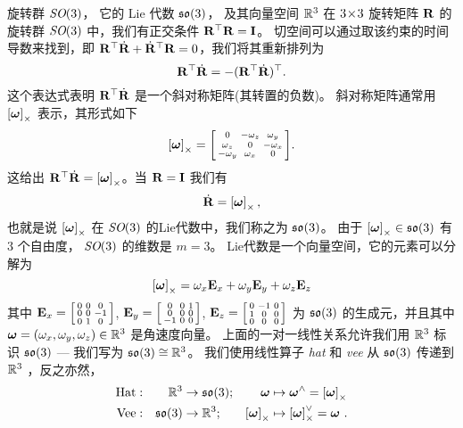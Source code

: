 
\begin{fexample}{旋转群 $\textit{SO}(3)$， 它的 Lie 代数 ${\mathfrak {so}}(3)$， 及其向量空间 ${\mathbb R}^3$}
\label{ex:SO3}
在 $3\!\times\!3$ 旋转矩阵 ${\bf R}$ 的旋转群 $\textit{SO}(3)$ 中，我们有正交条件 ${\bf R}^{\top}{\bf R}={\bf I}$。
切空间可以通过取该约束的时间导数来找到，即 ${\bf R}^{\top}\dot{{\bf R}}+\dot{{\bf R}}^{\top}{\bf R}=0$，我们将其重新排列为 $${\bf R}^{\top}\dot{{\bf R}}=-({\bf R}^{\top}\dot{{\bf R}})^{\top}.$$
这个表达式表明 ${\bf R}^{\top}\dot{{\bf R}}$ 是一个斜对称矩阵(其转置的负数)。
斜对称矩阵通常用 $\left[{{\bm \omega}}\right]_\times$ 表示，其形式如下 
%
$$\left[{{\bm \omega}}\right]_\times=\begin{bsmallmatrix}
0 & -\omega_z & \omega_y \\
\omega_z & 0 & -\omega_x \\
-\omega_y & \omega_x & 0 
\end{bsmallmatrix}
.$$
%
这给出 ${\bf R}^{\top}\dot{{\bf R}}=\left[{{\bm \omega}}\right]_\times$。当 ${\bf R}={\bf I}$ 我们有 $$\dot{{\bf R}}=\left[{{\bm \omega}}\right]_\times,$$ 也就是说 $\left[{{\bm \omega}}\right]_\times$ 在 $\textit{SO}(3)$ 的Lie代数中，我们称之为 ${\mathfrak {so}}(3)$。
%
由于 $\left[{{\bm \omega}}\right]_\times\in{\mathfrak {so}}(3)$ 有 $3$ 个自由度， $\textit{SO}(3)$ 的维数是 $m=3$。
Lie代数是一个向量空间，它的元素可以分解为
%
$$
\left[{{\bm \omega}}\right]_\times = 
  \omega_x{\bf E}_x+
  \omega_y{\bf E}_y+
  \omega_z{\bf E}_z
$$
其中  
$
{\bf E}_x=
\begin{bsmallmatrix}0&0&0\\0&0&-1\\0&1&0\end{bsmallmatrix}$, 
${\bf E}_y=
\begin{bsmallmatrix}0&0&1\\0&0&0\\-1&0&0\end{bsmallmatrix}$,
 ${\bf E}_z=
\begin{bsmallmatrix}0&-1&0\\1&0&0\\0&0&0\end{bsmallmatrix}$ 
为 ${\mathfrak {so}}(3)$ 的生成元，并且其中 ${{\bm \omega}}=(\omega_x,\omega_y,\omega_z)\in{\mathbb R}^3$ 是角速度向量。 
%
上面的一对一线性关系允许我们用 ${\mathbb R}^3$ 标识 ${\mathfrak {so}}(3)$ --- 我们写为 ${\mathfrak {so}}(3)\cong{\mathbb R}^3$。
我们使用线性算子 \emph{hat} 和 \emph{vee} 从 ${\mathfrak {so}}(3)$ 传递到 ${\mathbb R}^3$ ，反之亦然，
%
\begin{align*}
\textrm{Hat}&:& {\mathbb R}^3&\to{\mathfrak {so}}(3);& {{\bm \omega}}&\mapsto{{\bm \omega}}^\wedge=\left[{{\bm \omega}}\right]_\times 
\\
\textrm{Vee}&:& {\mathfrak {so}}(3)&\to{\mathbb R}^3;& \left[{{\bm \omega}}\right]_\times&\mapsto\left[{{\bm \omega}}\right]_\times^\vee={{\bm \omega}}
~.
\end{align*}
\end{fexample}

